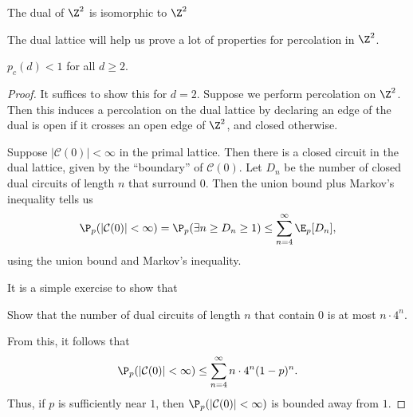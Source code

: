 \documentclass[a4paper]{article}
\begin{document}
\begin{eg}
  The dual of $\Z^2$ is isomorphic to $\Z^2$ %
  \begin{center}
  \end{center}
\end{eg}
The dual lattice will help us prove a lot of properties for percolation in $\Z^2$.

\begin{lemma}
  $p_c(d) < 1$ for all $d \geq 2$.
\end{lemma}

\begin{proof}
  It suffices to show this for $d = 2$. Suppose we perform percolation on $\Z^2$. Then this induces a percolation on the dual lattice by declaring an edge of the dual is open if it crosses an open edge of $\Z^2$, and closed otherwise.

  Suppose $|\mathcal{C}(0)| < \infty$ in the primal lattice. Then there is a closed circuit in the dual lattice, given by the ``boundary'' of $\mathcal{C}(0)$. Let $D_n$ be the number of closed dual circuits of length $n$ that surround $0$. Then the union bound plus Markov's inequality tells us
  \[
    \P_p(|\mathcal{C}(0)| < \infty) = \P_p(\exists n \geq D_n \geq 1) \leq \sum_{n = 4}^\infty \E_p[D_n],
  \]
  using the union bound and Markov's inequality.

  It is a simple exercise to show that
  \begin{ex}
    Show that the number of dual circuits of length $n$ that contain $0$ is at most $n \cdot 4^n$.
  \end{ex}
  From this, it follows that
  \[
    \P_p(|\mathcal{C}(0)| < \infty) \leq \sum_{n = 4}^\infty n \cdot 4^n (1 - p)^n.
  \]
  Thus, if $p$ is sufficiently near $1$, then $\P_p(|\mathcal{C}(0)| < \infty)$ is bounded away from $1$.
\end{proof}
\end{document}

